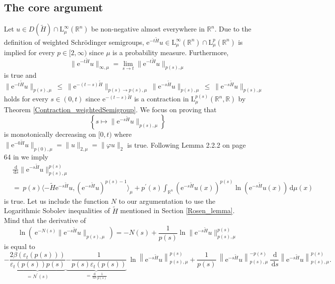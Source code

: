 \documentclass[12pt,longbibliography]{article}
\def\R{\mathbb{R}}
\def\d{\,\mathrm{d}}
\theoremstyle{definition}
\theoremstyle{remark}
\theoremstyle{example}
\begin{document}
\subsection{The core argument}

Let $u \in D(\tilde{H}) \cap \mathrm{L}_{\mu}^{\infty}(\R^{n})$ be non-negative almost everywhere in $\R^{n}$. 
Due to the definition of weighted Schrödinger semigroups, 
$\mathrm{e}^{-t\tilde{H}}u \in \mathrm{L}_{\mu}^{\infty}(\R^{n}) \cap \mathrm{L}_{\mu}^{p}(\R^{n})$ is implied
for every $p \in [2,\infty)$ since $\mu$ is a probability measure. Furthermore,
\begin{equation}
\|\mathrm{e}^{-t\tilde{H}}u \|_{\infty, \mu}  = \lim_{s \to t} \|\mathrm{e}^{-t\tilde{H}}u \|_{p(s), \mu} 
\end{equation}
is true and
\begin{equation} \label{Abschätzung_t-s}
\|\mathrm{e}^{-t\tilde{H}}u \|_{p(s), \mu} \ \leq \ \|\mathrm{e}^{-(t-s)\tilde{H}} \|_{p(s) \to p(s), \mu} \
\|\mathrm{e}^{-s\tilde{H}}u \|_{p(s), \mu}  \ \leq \  \|\mathrm{e}^{-s\tilde{H}}u \|_{p(s), \mu}
\end{equation}
holds for every $s \in (0,t)$ since $\mathrm{e}^{-(t-s)\tilde{H}}$ is a contraction in $\mathrm{L}_{\mu}^{p(s)}(\R^{n}, \R)$
by Theorem \ref{Contraction_weightedSemigroup}. We focus on proving that
$$
\left\{ s \mapsto \|\mathrm{e}^{-s\tilde{H}}u \|_{p(s), \mu} \right\}
$$
is monotonically decreasing on $[0,t)$ where
$\|\mathrm{e}^{-0\tilde{H}}u \|_{p(0), \mu} =  \| u \|_{2, \mu} = \| \varphi u \|_{2}$ is true.
Following Lemma 2.2.2 on page 64 in \cite{Davies07} we imply
\begin{align*}
& \frac{\d}{\d s} \|\mathrm{e}^{-s\tilde{H}}u \|^{p(s)}_{p(s), \mu} \\
& = \ p(s) \langle -\tilde{H}\mathrm{e}^{-s\tilde{H}}u, \left( \mathrm{e}^{-s\tilde{H}}u \right)^{p(s)-1}  \rangle_{\mu} 
+ p^{\prime}(s) \int_{\R^{n}} \left( \mathrm{e}^{-s\tilde{H}}u (x) \right)^{p(s)} \ln \left( \mathrm{e}^{-s\tilde{H}}u (x) \right) \d \mu(x)
\end{align*}
is true. Let us include the function $N$ to our argumentation to use the Logarithmic Sobolev inequalities of $\tilde{H}$ mentioned 
in Section \ref{Rosen_lemma}. 
Mind that the derivative of
$$
\ln \left( \ \mathrm{e}^{-N(s)}  \| \mathrm{e}^{-s\tilde{H}} u \|_{p(s),\mu} \ \right) 
= - N(s) + \frac{1}{p(s)} \ln \| \mathrm{e}^{-s\tilde{H}} u \|_{p(s),\mu}^{p(s)}
$$
is equal to
\begin{equation*}
 - \underbrace{\frac{2\beta\left( \varepsilon_{t}\left( p(s) \right) \right)}{\varepsilon_{t}\left( p(s) \right) p(s)}}_{=N^{\prime}(s)} 
\underbrace{- \frac{1}{p(s)  \varepsilon_{t}\left( p(s) \right)}}_{=\frac{\d}{\d s} \frac{1}{p(s)}} \  
\ln \left\| \mathrm{e}^{-s\tilde{H}} u \right\|_{p(s),\mu}^{p(s)}
 + \frac{1}{p(s)} \ \left\| \mathrm{e}^{-s\tilde{H}} u \right\|_{p(s),\mu}^{-p(s)} \ 
\frac{\d}{\d s} \left\| \mathrm{e}^{-s\tilde{H}} u \right\|_{p(s),\mu}^{p(s)}.
\end{equation*}
\end{document}
